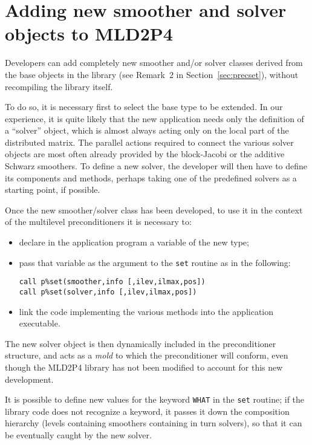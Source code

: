 
\clearpage

\section{Adding new  smoother and solver objects to MLD2P4\label{sec:adding}}

Developers can add completely new smoother and/or solver classes
derived from the base objects in the library (see Remark~2 in Section~\ref{sec:precset}),
without recompiling the library itself. 

To do so, it is necessary first to select the base type to be extended.
In our experience, it is quite likely that the new application needs
only the definition of a ``solver'' object, which is almost
always acting only on the local part of the distributed matrix. 
The parallel actions required to connect the various solver objects
are most often already provided by the block-Jacobi or the additive
Schwarz smoothers.  To define a new solver, the developer will then
have to define its components and methods, perhaps taking one of the
predefined solvers as a starting point, if possible. 

Once the new smoother/solver class has been developed, to use it in
the context of the multilevel preconditioners it is necessary to:
\begin{itemize}
\item declare in the application program a variable of the new type;
\item  pass that variable as the argument to the \verb|set| routine as in the
following:
\begin{center}
\verb|call p%set(smoother,info [,ilev,ilmax,pos])|\\
\verb|call p%set(solver,info [,ilev,ilmax,pos])|
\end{center}
\item link the code implementing the various methods into the application executable.
\end{itemize}
The new solver object is then dynamically included in the
preconditioner structure, and acts as a \emph{mold} to which the 
preconditioner will conform, even though the MLD2P4 library has not
been modified to account for this new development. 

It is possible to define new values for the keyword \verb|WHAT| in the
\verb|set| routine; if the library code does not recognize a keyword,
it passes it down the composition hierarchy (levels containing
smoothers containing in turn solvers), so that it can be eventually caught by
the new solver. 

